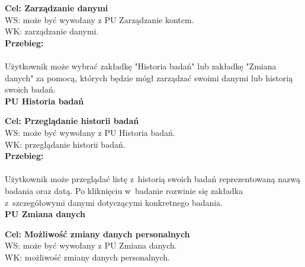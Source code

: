 \documentclass[12pt, letterpaper]{article}
\begin{document}
		\textbf{Cel: Zarządzanie danymi}\\
		
		WS: może być wywołany z PU Zarządzanie kontem.\\
		
		WK: zarządzanie danymi.\\
		
		\textbf{Przebieg:}
\paragraph{}Użytkownik może wybrać zakładkę "Historia badań" lub zakładkę "Zmiana danych" za pomocą, których będzie mógł zarządzać swoimi danymi lub historią swoich badań.\\
		 
		
		\textbf{PU Historia badań}
		
		\quad
		
		\textbf{Cel: Przeglądanie historii badań}\\
		
		WS: może być wywołany z PU Historia badań.\\
		
		WK: przeglądanie historii badań.\\
		
		\textbf{Przebieg:}
\paragraph{}Użytkownik może przeglądać listę z~historią swoich badań reprezentowaną nazwą badania oraz datą. Po kliknięciu w~badanie rozwinie się zakładka z~szczegółowymi danymi dotyczącymi konkretnego badania.\\
		 
		
		\textbf{PU Zmiana danych}
		
		\quad
		
		\textbf{Cel: Możliwość zmiany danych personalnych}\\
		
		WS: może być wywołany z PU Zmiana danych.\\
		
		WK: możliwość zmiany danych personalnych.\\
		
\end{document}
